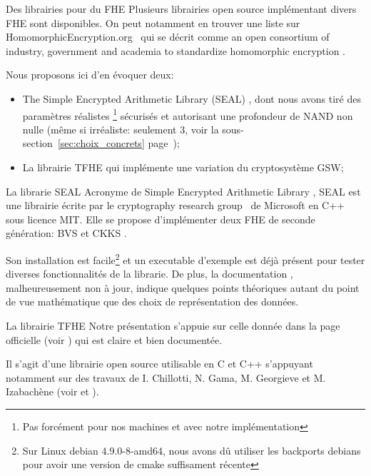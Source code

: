 \begin{section}{Des librairies pour du FHE}
Plusieurs librairies open source implémentant divers FHE sont disponibles. 
On peut notamment en trouver une liste sur HomomorphicEncryption.org~\cite{homencrypt.org}
qui se décrit comme \og an open consortium of industry, government and academia to 
standardize homomorphic encryption \fg.

Nous proposons ici d'en évoquer deux:
\begin{itemize}
\item The Simple Encrypted Arithmetic Library (SEAL) \cite{seal}, dont nous avons tiré des paramètres  
\og réalistes \fg\footnote{Pas forcément pour nos machines et avec notre implémentation}
sécurisés et autorisant une profondeur de NAND non nulle (même si irréaliste: seulement 3, voir la 
sous-section~\ref{sec:choix_concrets} page~\pageref{sec:choix_concrets});
\item La librairie TFHE \cite{TFHE} qui implémente une variation du cryptosystème GSW;
\end{itemize}

\begin{subsection}{La librarie SEAL}
Acronyme de \og Simple Encrypted Arithmetic Library \fg, SEAL \cite{seal}
est une librairie écrite par le \og cryptography research group \fg \ de Microsoft en C++ sous 
licence MIT. Elle se propose d'implémenter deux FHE de seconde génération: 
BVS \cite{EPRINT:FanVer12} et CKKS \cite{AC:CKKS17}.

Son installation est facile\footnote{Sur Linux debian 4.9.0-8-amd64, nous avons dû
utiliser les backports debians pour avoir une version de cmake suffisament récente}
et un executable d'exemple est déjà présent pour tester diverses fonctionnalités de la librarie. De plus, la
documentation \cite{seal_manual_231}, malheureusement non à jour, indique quelques points théoriques autant du point de
vue mathématique que des choix de représentation des données.
\end{subsection}

\begin{subsection}{La librairie TFHE}
Notre présentation s'appuie sur celle donnée dans la page officielle (voir \cite{TFHE})
 qui est claire et bien documentée.

Il s'agit d'une librairie open source utilisable en C et C++ s'appuyant notamment sur des travaux de I. Chillotti, N. Gama, M. Georgieve et M. Izabachène 
(voir \cite{cryptoeprint:2016:870} et \cite{cryptoeprint:2017:430}). 


\end{subsection}
\end{section}
